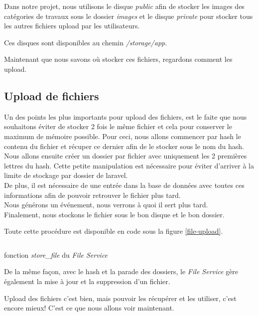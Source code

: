\documentclass[
    iai, %
    il, %
]{heig-tb}
\begin{document}
Dans notre projet, nous utilisons le disque \emph{public} afin de stocker les images des catégories de travaux sous le dossier \emph{images} et le disque \emph{private} pour stocker tous les autres fichiers upload par les utilisateurs.

Ces disques sont disponibles au chemin \emph{/storage/app}.

Maintenant que nous savons où stocker ces fichiers, regardons comment les upload.

\subsection{Upload de fichiers}
Un des points les plus importants pour upload des fichiers, est le faite que nous souhaitons éviter de stocker 2 fois le même fichier et cela pour conserver le maximum de mémoire possible. Pour ceci, nous allons commencer par \Gls{hash} le contenu du fichier et récuper ce dernier afin de le stocker sous le nom du \Gls{hash}. \\
Nous allons ensuite créer un dossier par fichier avec uniquement les 2 premières lettres du \Gls{hash}. Cette petite manipulation est nécessaire pour éviter d'arriver à la limite de stockage par dossier de \Gls{laravel}. \\
De plus, il est nécessaire de une entrée dans la base de données avec toutes ces informations afin de pouvoir retrouver le fichier plus tard. \\
Nous générons un événement, nous verrons à quoi il sert plus tard. \\
Finalement, nous stockons le fichier sous le bon disque et le bon dossier.

Toute cette procédure est disponible en code sous la figure \ref{file-upload}.

\begin{listing}[h]
    \inputminted{php}{assets/code/FileUpload.php}
    \caption{fonction \emph{store\_file} du \emph{File Service} \label{file-upload}}
\end{listing}

De la même façon, avec le \Gls{hash} et la parade des dossiers, le \emph{File Service} gère également la mise à jour et la suppression d'un fichier.

Upload des fichiers c'est bien, mais pouvoir les récupérer et les utiliser, c'est encore mieux!
C'est ce que nous allons voir maintenant.
\end{document}

